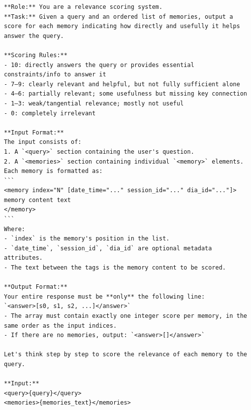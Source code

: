 \begin{center}
\begin{tcolorbox}[title={Filter Module Prompt (Mid)}]
{
\begin{Verbatim}[breaklines, breakanywhere,fontfamily=tt, fontseries=b, baselinestretch=0.95]
**Role:** You are a relevance scoring system.  
**Task:** Given a query and an ordered list of memories, output a score for each memory indicating how directly and usefully it helps answer the query.

**Scoring Rules:**  
- 10: directly answers the query or provides essential constraints/info to answer it  
- 7–9: clearly relevant and helpful, but not fully sufficient alone  
- 4–6: partially relevant; some usefulness but missing key connection
- 1–3: weak/tangential relevance; mostly not useful  
- 0: completely irrelevant

**Input Format:**  
The input consists of:  
1. A `<query>` section containing the user's question.  
2. A `<memories>` section containing individual `<memory>` elements.  
Each memory is formatted as:  
```
<memory index="N" [date_time="..." session_id="..." dia_id="..."]>
memory content text
</memory>
```  
Where:  
- `index` is the memory's position in the list.  
- `date_time`, `session_id`, `dia_id` are optional metadata attributes.  
- The text between the tags is the memory content to be scored.

**Output Format:**  
Your entire response must be **only** the following line:  
`<answer>[s0, s1, s2, ...]</answer>`  
- The array must contain exactly one integer score per memory, in the same order as the input indices.  
- If there are no memories, output: `<answer>[]</answer>`

Let's think step by step to score the relevance of each memory to the query.

**Input:**  
<query>{query}</query>  
<memories>{memories_text}</memories> 
\end{Verbatim}
}
\label{appendix:case_1}
\end{tcolorbox}
\end{center}


